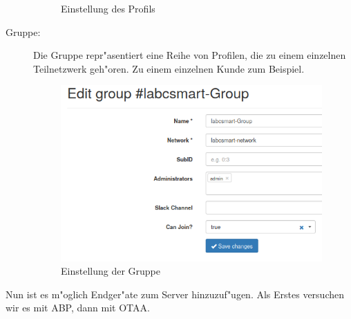 \begin{description}
	\begin{figure}[h!]
		\centering
		\caption{Einstellung des Profils}
	\end{figure}
	
	\item[Gruppe:] Die Gruppe repr"asentiert eine Reihe von Profilen,
	die zu einem einzelnen Teilnetzwerk geh"oren. Zu einem einzelnen
	Kunde zum Beispiel.
	\begin{figure}[h]
		\centering
		\includegraphics[width=10cm]{source/images/Labcsmart_group}
		\caption{Einstellung der Gruppe\label{fig:group}}
	\end{figure}
\end{description}
\vspace{10cm}
Nun ist es m"oglich Endger"ate zum Server hinzuzuf"ugen. Als Erstes
versuchen wir es mit ABP, dann mit OTAA.

